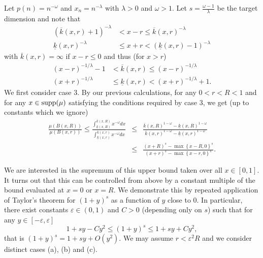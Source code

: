 \documentclass[12pt]{amsart}
\numberwithin{equation}{section}
\renewcommand{\le}{\leqslant}
\begin{document}
Let $p(n)=n^{-\omega}$ and $x_n=n^{-\lambda}$ with $\lambda>0$ and $\omega>1$.  Let $s=\frac{\omega-1}{\lambda}$ be the target dimension and note that
\begin{align*}
(\overline{k}(x,r)+1)^{-\lambda}&<x-r\le \overline{k}(x,r)^{-\lambda} \\
\underline{k}(x,r)^{-\lambda}&\le x+r< (\underline{k}(x,r)-1)^{-\lambda} 
\end{align*}
with $\overline{k}(x,r) = \infty$ if $x-r\le 0$ and thus (for $x > r$)
\begin{align*}
      (x-r)^{-1/\lambda}-1 &< \overline{k}(x,r) \le (x-r)^{-1/\lambda} \\
      (x+r)^{-1/\lambda} &\le \underline{k}(x,r) < (x+r)^{-1/\lambda}+1.
\end{align*}
We first consider case 3. By our previous calculations, for any $0<r<R<1$ and for any $x\in \textup{supp}(\mu)$ satisfying the conditions required by case 3, we get (up to constants which we ignore)
\begin{eqnarray*}
\frac{\mu(B(x,R))}{\mu(B(x,r))} \le \frac{\int_{\underline{k}(x,R)}^{\overline{k}(x,R)} x^{-\omega}dx}{\int_{\underline{k}(x,r)}^{\overline{k}(x,r)} x^{-\omega}dx} &\le& \frac{\overline{k}(x,R)^{1-\omega}-\underline{k}(x,R)^{1-\omega}}{\overline{k}(x,r)^{1-\omega}-\underline{k}(x,r)^{1-\omega}} \\ 
& \le & \frac{(x+R)^{s}-\max\left\{ x-R,0\right\}^{s}}{(x+r)^{s}-\max\left\{x-r,0\right\}^s}.
\end{eqnarray*}



We are interested in the supremum of this upper bound taken over all $x \in [0,1]$.  It turns out that this can be controlled from above by a constant  multiple of the bound evaluated at $x=0$ or $x=R$.  We demonstrate this by repeated application of Taylor's theorem for   $(1+y)^s$ as a function of $y$ close to 0. In particular,   there exist constants $\varepsilon \in (0,1)$ and $C > 0$ (depending only on $s$) such that for any $y \in [-\varepsilon, \varepsilon]$
\[
1 + s y - C y^2 \le (1+y)^s \le 1 + s y + C y^2,
\]
that is $ (1+y)^s = 1 + s y +O( y^2)$.  We may assume $r<\varepsilon^2 R$ and we consider distinct cases (a), (b) and (c).
\end{document}
